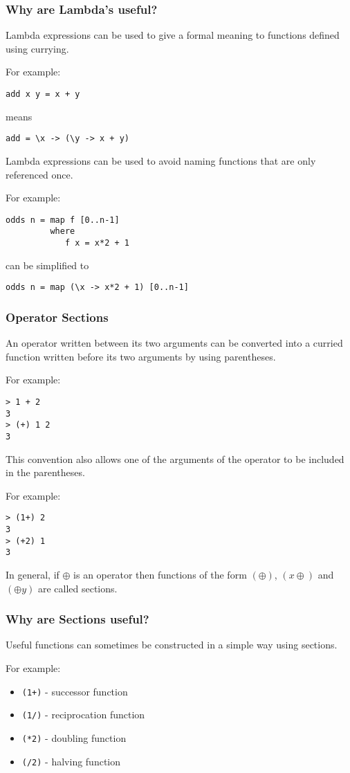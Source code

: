 \begin{multicols}{2}
\subsubsection{Why are Lambda's useful?}
Lambda expressions can be used to give a formal meaning to functions defined using currying.

For example:
\begin{lstlisting}
add x y = x + y
\end{lstlisting}
means
\begin{lstlisting}
add = \x -> (\y -> x + y)
\end{lstlisting}

Lambda expressions can be used to avoid naming functions that are only referenced once.

For example:
\begin{lstlisting}
odds n = map f [0..n-1]
         where
            f x = x*2 + 1
\end{lstlisting}
can be simplified to
\begin{lstlisting}
odds n = map (\x -> x*2 + 1) [0..n-1]
\end{lstlisting}

\subsubsection{Operator Sections}
An operator written between its two arguments can be converted into a curried function written before its two arguments by using parentheses.

For example:
\begin{lstlisting}
> 1 + 2
3
> (+) 1 2
3
\end{lstlisting}

This convention also allows one of the arguments of the operator to be included in the parentheses.

For example:
\begin{lstlisting}
> (1+) 2
3
> (+2) 1
3
\end{lstlisting}

In general, if $\oplus$ is an operator then functions of the form $(\oplus)$, $(x\oplus)$ and $(\oplus y)$ are called sections.

\subsubsection{Why are Sections useful?}
Useful functions can sometimes be constructed in a simple way using sections.

For example:
\begin{itemize}
  \item[\-] \lstinline{(1+)} - successor function
  \item[\-] \lstinline{(1/)} - reciprocation function
  \item[\-] \lstinline{(*2)} - doubling function
  \item[\-] \lstinline{(/2)} - halving function    
\end{itemize}


\end{multicols}
